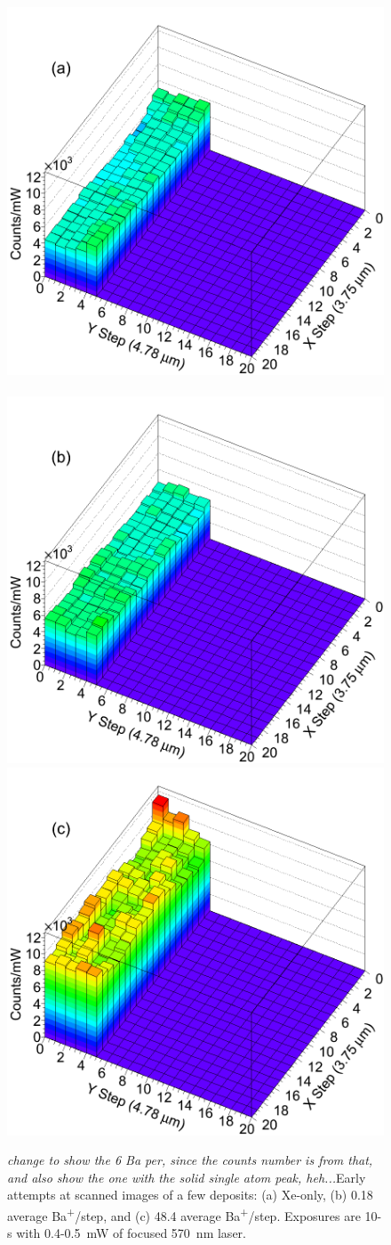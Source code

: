 \begin{figure} %
        \centering
                \includegraphics[width=.5\textwidth]{figures/scan_a.png}
                ~
                \includegraphics[width=.5\textwidth]{figures/scan_b.png}
                \includegraphics[width=.5\textwidth]{figures/scan_c.png}
                \caption{\emph{\color{gray}change to show the 6 Ba per, since the counts number is from that, and also show the one with the solid single atom peak, heh...}Early attempts at scanned images of a few deposits: (a) Xe-only, (b) 0.18 average Ba\textsuperscript{+}/step, and (c) 48.4 average Ba\textsuperscript{+}/step.  Exposures are 10-s with 0.4-0.5~mW of focused 570~nm laser.}
\label{fig:scans}
\end{figure}

